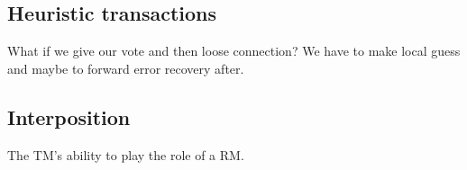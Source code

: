 \subsection{Heuristic transactions}
What if we give our vote and then loose connection? We have to make local guess and maybe to forward error recovery after.

\subsection{Interposition}
The TM's ability to play the role of a RM.
